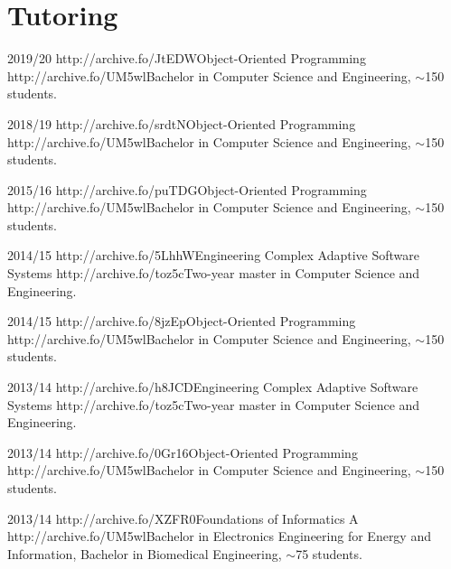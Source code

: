 \section{Tutoring}
\vspace{-1.9em}
\begin{outerlist}
    \item[2019/20]
        \shortunibocourse
        {http://archive.fo/JtEDW}{Object-Oriented Programming}
        {http://archive.fo/UM5wl}{Bachelor in Computer Science and Engineering}, $\sim$150 students.
    \item[2018/19]
        \shortunibocourse
        {http://archive.fo/srdtN}{Object-Oriented Programming}
        {http://archive.fo/UM5wl}{Bachelor in Computer Science and Engineering}, $\sim$150 students.
    \item[2015/16]
        \shortunibocourse
        {http://archive.fo/puTDG}{Object-Oriented Programming}
        {http://archive.fo/UM5wl}{Bachelor in Computer Science and Engineering}, $\sim$150 students.
    \item[2014/15]
        \shortunibocourse
        {http://archive.fo/5LhhW}{Engineering Complex Adaptive Software Systems}
        {http://archive.fo/toz5c}{Two-year master in Computer Science and Engineering}.
    \item[2014/15]
        \shortunibocourse
        {http://archive.fo/8jzEp}{Object-Oriented Programming}
        {http://archive.fo/UM5wl}{Bachelor in Computer Science and Engineering}, $\sim$150 students.
    \item[2013/14]
        \shortunibocourse
        {http://archive.fo/h8JCD}{Engineering Complex Adaptive Software Systems}
        {http://archive.fo/toz5c}{Two-year master in Computer Science and Engineering}.
    \item[2013/14]
        \shortunibocourse
        {http://archive.fo/0Gr16}{Object-Oriented Programming}
        {http://archive.fo/UM5wl}{Bachelor in Computer Science and Engineering}, $\sim$150 students.
    \item[2013/14]
        \shortunibocourse
        {http://archive.fo/XZFR0}{Foundations of Informatics A}
        {http://archive.fo/UM5wl}{Bachelor in Electronics Engineering for Energy and Information, Bachelor in Biomedical Engineering}, $\sim$75 students.
\end{outerlist}

